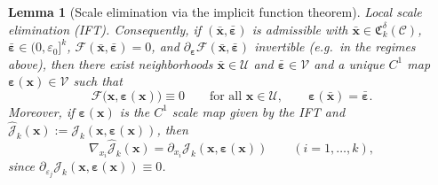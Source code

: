 \documentclass[11pt,reqno,a4paper]{amsart}
\numberwithin{equation}{section}
\theoremstyle{plain}
\newtheorem{lemma}[theorem]{Lemma}
\theoremstyle{remark}
\theoremstyle{plain}
\begin{document}
\begin{lemma}[Scale elimination via the implicit function theorem]
\smallskip
\noindent\textup{Local scale elimination (IFT).}
Consequently, if $(\bar{\mathbf x},\bar{\boldsymbol\varepsilon})$ is admissible with
$\bar{\mathbf x}\in\mathfrak C_k^\delta(\mathcal C)$, $\bar{\boldsymbol\varepsilon}\in(0,\varepsilon_0]^k$,
$\mathcal F(\bar{\mathbf x},\bar{\boldsymbol\varepsilon})=0$, and
$\partial_{\boldsymbol\varepsilon}\mathcal F(\bar{\mathbf x},\bar{\boldsymbol\varepsilon})$ invertible
(e.g.\ in the regimes above), then there exist neighborhoods
$\bar{\mathbf x}\in\mathcal U$ and $\bar{\boldsymbol\varepsilon}\in\mathcal V$ and a unique $C^1$ map
$\boldsymbol\varepsilon(\mathbf x)\in\mathcal V$ such that
\[
\mathcal F\big(\mathbf x,\boldsymbol\varepsilon(\mathbf x)\big)\equiv0
\qquad\text{for all }\mathbf x\in\mathcal U,
\qquad
\boldsymbol\varepsilon(\bar{\mathbf x})=\bar{\boldsymbol\varepsilon}.
\]
Moreover, if $\boldsymbol\varepsilon(\mathbf x)$ is the $C^1$ scale map given by the IFT and
$\widehat{\mathcal J}_k(\mathbf x):=\mathcal J_k(\mathbf x,\boldsymbol\varepsilon(\mathbf x))$, then
\[
\nabla_{x_i}\widehat{\mathcal J}_k(\mathbf x)
=\partial_{x_i}\mathcal J_k(\mathbf x,\boldsymbol\varepsilon(\mathbf x))
\qquad (i=1,\dots,k),
\]
since $\partial_{\varepsilon_j}\mathcal J_k(\mathbf x,\boldsymbol\varepsilon(\mathbf x))\equiv0$.
\end{lemma}
\end{document}
